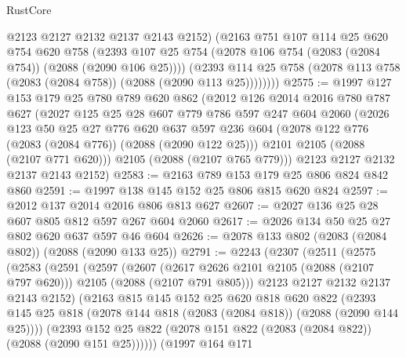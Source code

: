 \begin{lexlean}{RustCore}
\begin{coremodule}
            @2123
            @2127
            @2132
            @2137
            @2143
            @2152)
          (@2163
            @751
            @107
            @114
            @25
            @620
            @754
            @620
            @758
            (@2393 @107 @25 @754 (@2078 @106 @754 (@2083 (@2084 @754)) (@2088 (@2090 @106 @25))))
            (@2393
              @114
              @25
              @758
              (@2078 @113 @758 (@2083 (@2084 @758)) (@2088 (@2090 @113 @25))))))))
@2575 := @1997
    @127
    @153
    @179
    @25
    @780
    @789
    @620
    @862
    (@2012
      @126
      @2014
      @2016
      @780
      @787
      @627
      (@2027
        @125
        @25
        @28
        @607
        @779
        @786
        @597
        @247
        @604
        @2060
        (@2026
          @123
          @50
          @25
          @27
          @776
          @620
          @637
          @597
          @236
          @604
          (@2078 @122 @776 (@2083 (@2084 @776)) (@2088 (@2090 @122 @25)))
          @2101
          @2105
          (@2088 (@2107 @771 @620)))
        @2105
        (@2088 (@2107 @765 @779)))
      @2123
      @2127
      @2132
      @2137
      @2143
      @2152)
@2583 := @2163 @789 @153 @179 @25 @806 @824 @842 @860
@2591 := @1997 @138 @145 @152 @25 @806 @815 @620 @824
@2597 := @2012 @137 @2014 @2016 @806 @813 @627
@2607 := @2027 @136 @25 @28 @607 @805 @812 @597 @267 @604 @2060
@2617 := @2026 @134 @50 @25 @27 @802 @620 @637 @597 @46 @604
@2626 := @2078 @133 @802 (@2083 (@2084 @802)) (@2088 (@2090 @133 @25))
@2791 := @2243
    (@2307
      (@2511
        (@2575
          (@2583
            (@2591
              (@2597
                (@2607
                  (@2617 @2626 @2101 @2105 (@2088 (@2107 @797 @620)))
                  @2105
                  (@2088 (@2107 @791 @805)))
                @2123
                @2127
                @2132
                @2137
                @2143
                @2152)
              (@2163
                @815
                @145
                @152
                @25
                @620
                @818
                @620
                @822
                (@2393
                  @145
                  @25
                  @818
                  (@2078 @144 @818 (@2083 (@2084 @818)) (@2088 (@2090 @144 @25))))
                (@2393
                  @152
                  @25
                  @822
                  (@2078 @151 @822 (@2083 (@2084 @822)) (@2088 (@2090 @151 @25))))))
            (@1997
              @164
              @171

\end{coremodule}
\end{lexlean}
